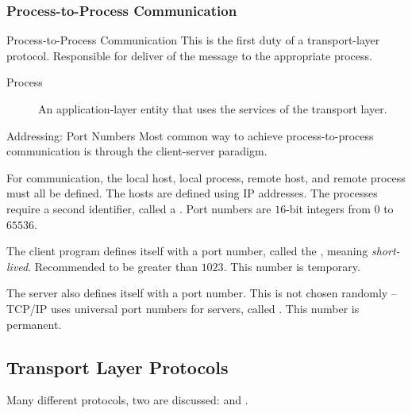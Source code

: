 \documentclass[\main/notes.tex]{subfiles}
\begin{document}
				\subsubsection{Process-to-Process Communication}
					\begin{definition}{Process-to-Process Communication}
						This is the first duty of a transport-layer protocol. Responsible for deliver of the message to the appropriate process.
							\begin{indentparagraph}
								\begin{description}
									\item[Process] An application-layer entity that uses the services of the transport layer.
								\end{description}
							\end{indentparagraph}
					\end{definition}
					\begin{definition}{Addressing: Port Numbers}
						Most common way to achieve process-to-process communication is through the client-server paradigm.

						For communication, the local host, local process, remote host, and remote process must all be defined. The hosts are defined using IP addresses. The processes require a second identifier, called a . Port numbers are $16$-bit integers from $0$ to $65536$.

						The client program defines itself with a port number, called the , meaning \emph{short-lived}. Recommended to be greater than $1023$. This number is temporary.

						The server also defines itself with a port number. This is not chosen randomly -- TCP/IP uses universal port numbers for servers, called . This number is permanent.
					\end{definition}
			\subsection{Transport Layer Protocols}
				Many different protocols, two are discussed:  and .
\end{document}
